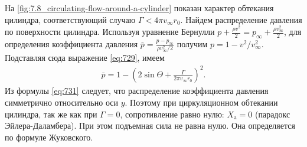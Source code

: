 	На \cref{fig:7.8_circulating-flow-around-a-cylinder} показан характер обтекания цилиндра, соответствующий случаю $\Gamma < 4\pi v_\infty r_0$.\n
	Найдем распределение давления по поверхности цилиндра. Используя уравнение Бернулли $p + \frac{\rho v^2}{2} = p_\infty + \frac{\rho v_\infty^2}{2}$, для определения коэффициента давления $\bar{p} = \frac{p - p_\infty}{\rho v_\infty^2/2}$ получим $p = 1 - v^2/v_\infty^2$. Подставляя сюда выражение \eqref{eq:729}, имеем
	\begin{gather}
		\bar{p} = 1 - \left(2\sin\varTheta + \frac{\Gamma}{2\pi v_\infty r_0}\right)^2.\label{eq:731}
	\end{gather}\n
	Из формулы \eqref{eq:731} следует, что распределение коэффициента давления симметрично относительно оси $y$. Поэтому при циркуляционном обтекании цилиндра, так же как при $\Gamma = 0$, сопротивление равно нулю: $X_\mathrm{a} = 0$ (парадокс Эйлера-Даламбера). При этом подъемная сила не равна нулю. Она определяется по формуле Жуковского.
	
